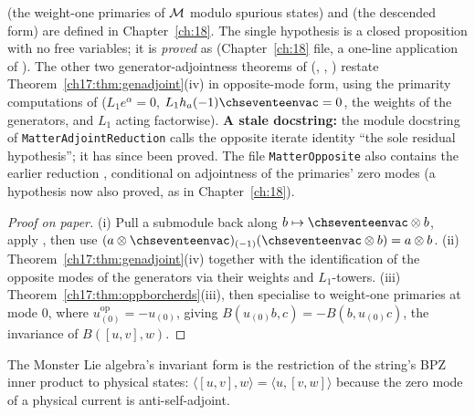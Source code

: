 \begin{dictionary}
 (the weight-one primaries of $\mathcal{M}$ modulo spurious states) and 
(the descended form) are defined in Chapter~\ref{ch:18}.  The single hypothesis  is a closed proposition with no
free variables; it is \emph{proved} as  (Chapter~\ref{ch:18} file, a
one-line application of ).  The other two generator-adjointness theorems
of  (,
, ) restate Theorem~\ref{ch17:thm:genadjoint}(iv) in opposite-mode form, using the
primarity computations of  ($L_1e^\alpha=0$, $L_1h_a(-1)\chseventeenvac=0$, the
weights of the generators, and $L_1$ acting factorwise).  \textbf{A stale docstring:} the module docstring of
\texttt{MatterAdjointReduction} calls the opposite iterate identity ``the sole residual hypothesis''; it has since been
proved.  The file \texttt{MatterOpposite} also contains the earlier reduction
, conditional on adjointness of the primaries' zero modes (a
hypothesis now also proved, as  in Chapter~\ref{ch:18}).
\end{dictionary}

\begin{proof}[Proof on paper]
(i) Pull a submodule back along $b\mapsto\chseventeenvac\otimes b$, apply , then
use $(a\otimes\chseventeenvac)_{(-1)}(\chseventeenvac\otimes b)=a\otimes b$.  (ii) Theorem~\ref{ch17:thm:genadjoint}(iv) together with the
identification of the opposite modes of the generators via their weights and $L_1$-towers.  (iii)
Theorem~\ref{ch17:thm:oppborcherds}(iii), then specialise to weight-one primaries at mode $0$, where
$u^{\mathrm{op}}_{(0)}=-u_{(0)}$, giving $B(u_{(0)}b,c)=-B(b,u_{(0)}c)$, the invariance of $B([u,v],w)$.
\end{proof}

\begin{physics}
The Monster Lie algebra's invariant form is the restriction of the string's BPZ inner product to physical states:
$\langle[u,v],w\rangle=\langle u,[v,w]\rangle$ because the zero mode of a physical current is anti-self-adjoint.
\end{physics}

